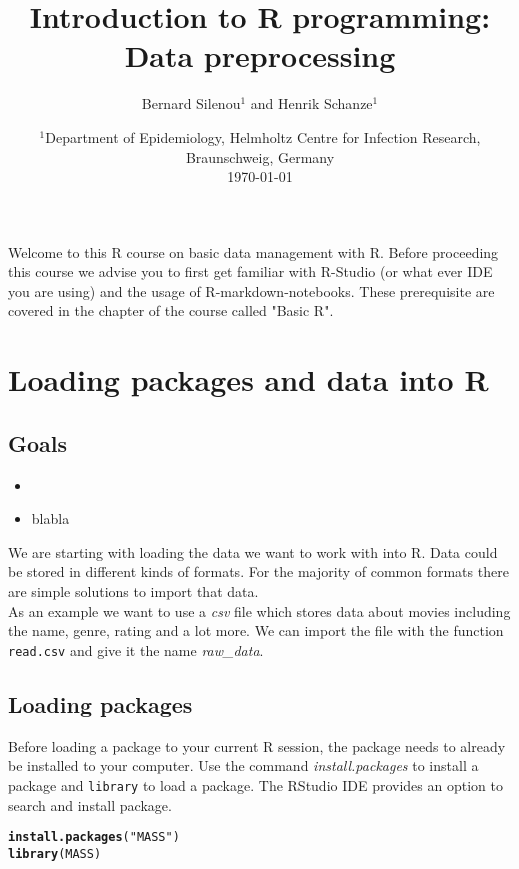 \documentclass[a4paper]{article}\usepackage[]{graphicx}\usepackage[]{xcolor}
\title{Introduction to R programming: Data preprocessing}
\author{Bernard Silenou$^1$ and Henrik Schanze$^1$}
\date{%
    $^{1}$Department of Epidemiology, Helmholtz Centre for Infection Research, Braunschweig, Germany\\%
   \vspace{2em}
    \today
}
\makeatletter
\newcommand{\hlstr}[1]{\textcolor[rgb]{0.192,0.494,0.8}{#1}}%
\newcommand{\hlstd}[1]{\textcolor[rgb]{0.345,0.345,0.345}{#1}}%
\newcommand{\hlkwd}[1]{\textcolor[rgb]{0.737,0.353,0.396}{\textbf{#1}}}%
\newenvironment{kframe}{%
 \def\at@end@of@kframe{}%
 \ifinner\ifhmode%
  \def\at@end@of@kframe{\end{minipage}}%
  \begin{minipage}{\columnwidth}%
 \fi\fi%
 \def\FrameCommand##1{\hskip\@totalleftmargin \hskip-\fboxsep
 \colorbox{shadecolor}{##1}\hskip-\fboxsep
     \hskip-\linewidth \hskip-\@totalleftmargin \hskip\columnwidth}%
 \MakeFramed {\advance\hsize-\width
   \@totalleftmargin\z@ \linewidth\hsize
   \@setminipage}}%
 {\par\unskip\endMakeFramed%
 \at@end@of@kframe}
\newenvironment{knitrout}{}{} %
\makeatother
\begin{document}
\maketitle
\vfill
\tableofcontents
\clearpage



\noindent Welcome to this R course on basic data management with R. Before proceeding this course we advise you to first get familiar with R-Studio (or what ever IDE you are using) and the usage of R-markdown-notebooks. These prerequisite are covered in the chapter of the course called "Basic R".

\section{Loading packages and data into R}
\subsection*{Goals}
\begin{itemize}
\item 
\item blabla
\end{itemize}

\noindent We are starting with loading the data we want to work with into R. Data could be stored in different kinds of formats. For the majority of common formats there are simple solutions to import that data.\\
As an example we want to use a \textit{csv} file which stores data about movies including the name, genre, rating and a lot more. We can import the file with the function \texttt{read.csv} and give it the name  \textit{raw\_data}.

\subsection{Loading packages}
Before loading a package to  your current R session, the package needs to already be installed to your computer. Use the command \textit{install.packages} to install a package and \texttt{library} to load a package. The RStudio IDE provides an option to search and install  package. 

\begin{knitrout}
\color{fgcolor}\begin{kframe}
\begin{alltt}
\hlkwd{install.packages}\hlstd{(}\hlstr{"MASS"}\hlstd{)}
\hlkwd{library}\hlstd{(MASS)}
\end{alltt}
\end{kframe}
\end{knitrout}
\end{document}
